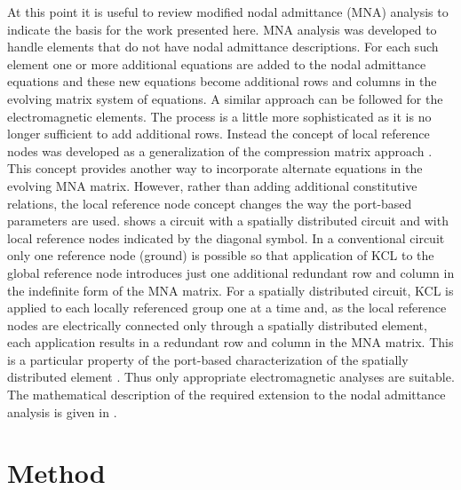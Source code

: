 At this point it is useful to review modified nodal admittance (MNA)
analysis to indicate the basis for the work presented here. MNA
analysis was developed to handle elements that do not have nodal
admittance descriptions.  For each such element one or more additional
equations are added to the nodal admittance equations and these new
equations become additional rows and columns in the evolving matrix
system of equations.  A similar approach can be followed for the
electromagnetic elements.  The process is a little more sophisticated
as it is no longer sufficient to add additional rows.  Instead the
concept of local reference nodes was developed
\cite{local:reference:node:khalil} as a generalization of the
compression matrix approach \cite{kunisch}. This concept provides
another way to incorporate alternate equations in the evolving MNA
matrix. However, rather than adding additional constitutive relations,
the local reference node concept changes the way the port-based
parameters are used.  shows a circuit with a spatially distributed
circuit and with local reference nodes indicated by the diagonal
symbol.  In a conventional circuit only one reference node (ground) is
possible so that application of KCL to the global reference node
introduces just one additional redundant row and column in the
indefinite form of the MNA matrix. For a spatially distributed
circuit, KCL is applied to each locally referenced group one at a time
and, as the local reference nodes are electrically connected only
through a spatially distributed element, each application results in a
redundant row and column in the MNA matrix. This is a particular
property of the port-based characterization of the spatially
distributed element \cite{local:reference:node:khalil}. Thus only
appropriate electromagnetic analyses are suitable. The mathematical
description of the required extension to the nodal admittance analysis
is given in \cite{local:reference:node:khalil}.

\section{Method}

